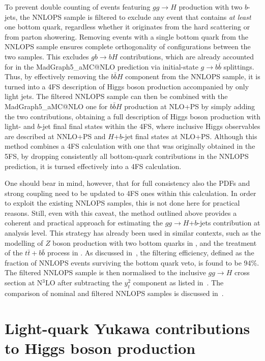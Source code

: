 \documentclass[11pt,a4paper]{article}
\begin{document}
To prevent double counting of events featuring $gg \to H$ production with two $b$-jets, the {\sc NNLOPS} sample is filtered to exclude any event that contains 
{\it at least} one bottom quark, regardless whether it originates from the hard scattering or from parton showering. 
Removing events with a single bottom quark from the {\sc NNLOPS} sample ensures complete orthogonality of configurations between the two samples. 
This excludes $g  b \to b H$ contributions, which are already accounted for in the {\sc MadGraph5\_aMC@NLO} prediction via initial-state $g \to b\bar{b}$ splittings. Thus, by effectively removing the $b\bar{b}H$ component from the {\sc NNLOPS} sample, it is turned 
into a 4FS description of Higgs boson production accompanied by 
only light jets. The filtered {\sc NNLOPS} sample can then be combined with the {\sc MadGraph5\_aMC@NLO} one for 
$b\bar{b}H$ production at NLO+PS by simply adding the two contributions, obtaining a full description of Higgs boson production with light- and $b$-jet
final final states within the 4FS, where inclusive Higgs observables are described at NNLO+PS and $H$+$b$-jet final states at NLO+PS. 
Although this method combines a 4FS calculation with one that was originally obtained in the 5FS, by dropping consistently all bottom-quark contributions
in the NNLOPS prediction, it is turned effectively into a 4FS calculation.

One should bear in mind, however, that for full consistency also the PDFs and strong
coupling need to be updated to 4FS ones within this calculation. In order to exploit the existing NNLOPS samples, this is not done here for practical reasons.
Still, even with this caveat, the method outlined above provides a coherent and practical approach for estimating the $gg \to H$+$b$-jets contribution at analysis level. 
This strategy has already been used in similar contexts, such as the modelling of $Z$ boson production with two bottom quarks in , and the treatment of the $t\bar{t}+b\bar{b}$ process in .  
As discussed in~, the filtering efficiency, defined as the fraction of {\sc NNLOPS} events surviving the bottom quark veto, is found to be 94\%. The filtered {\sc NNLOPS} sample is then normalised to the inclusive $gg \to H$ cross section at N$^3$LO after subtracting the $y_t^2$ \bbH{} component as listed in~. The comparison of nominal and filtered {\sc NNLOPS} samples is discussed in~.


\section{Light-quark Yukawa contributions to Higgs boson production}\label{sec:lightYukawa}
\end{document}
